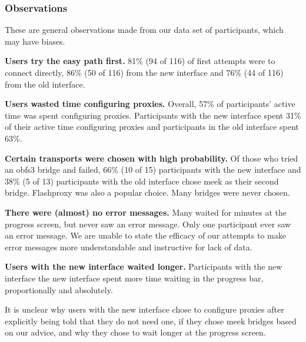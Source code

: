 \documentclass[USenglish,oneside,twocolumn]{article}
\begin{document}
\subsubsection{Observations}
These are general observations made from our data set of participants, which may have biases.\\

\begin{description}
\item {\bfseries Users try the easy path first.}
81\% (94 of 116) of first attempts were to connect directly, 86\% (50 of 116) from the new interface and 76\% (44 of 116) from the old interface. 

\item {\bfseries Users wasted time configuring proxies.} Overall, 57\% of participants' active time was spent configuring proxies. Participants with the new interface spent 31\% of their active time configuring proxies and participants in the old interface spent 63\%.

\item {\bfseries Certain transports were chosen with high probability.}
Of those who tried an obfs3 bridge and failed, 
66\% (10 of 15) participants with the new interface and 38\% (5 of 13) participants with the old interface chose meek as their second bridge. Flashproxy was also a popular choice. Many bridges were never chosen. 

\item {\bfseries There were (almost) no error messages.} Many waited for minutes at the progress screen, but never saw an error message. Only one participant ever saw an error message. We are unable to state the efficacy of our attempts to make error messages more understandable and instructive for lack of data.  

\item {\bfseries Users with the new interface waited longer.}
Participants with the new interface the new interface spent more time waiting in the progress bar, proportionally and absolutely. 
\end{description} 

It is unclear why users with the new interface chose to configure proxies after explicitly being told that they do not need one, if they chose meek bridges based on our advice, and why they chose to wait longer at the progress screen. 
\end{document}
